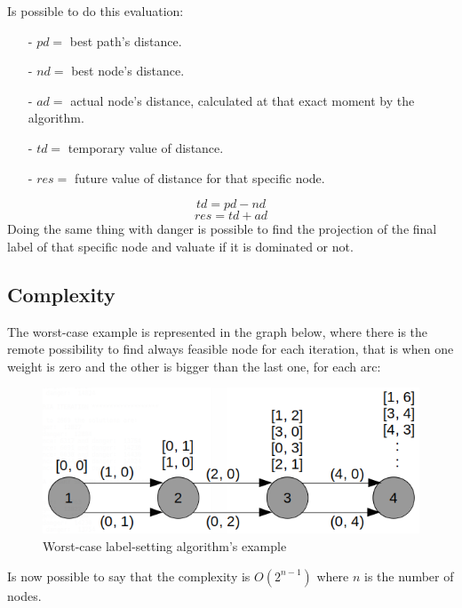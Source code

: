 \documentclass[a4paper,11pt]{report}
\begin{document}
Is possible to do this evaluation:
\begin{itemize}
	\item[-] $pd =$ best path's distance.
	\item[-] $nd =$ best node's distance.
	\item[-] $ad =$ actual node's distance, calculated at that exact moment by the algorithm.
	\item[-] $td =$ temporary value of distance.
	\item[-] $res =$ future value of distance for that specific node.
\end{itemize}
$$ td = pd - nd$$
$$res = td + ad$$
Doing the same thing with danger is possible to find the projection of the final label of that specific node and valuate if it is dominated or not.
\subsection{Complexity}
The worst-case example is represented in the graph below, where there is the remote possibility to find always feasible node for each iteration, that is when one weight is zero and the other is bigger than the last one, for each arc:

\begin{figure}[H]
	\centering
	\includegraphics[width=\linewidth]{img/labelSettingComplexity.png}
	\caption{Worst-case label-setting algorithm's example}
	\label{fig:worstCaseLabelSettin}
\end{figure}
Is now possible to say that the complexity is $O(2^{n-1})$ where $n$ is the number of nodes. 
\end{document}
